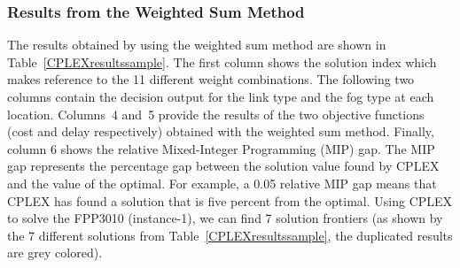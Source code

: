 \documentclass[10pt,journal,compsoc]{IEEEtran}
\begin{document}
\subsubsection{Results from the Weighted Sum Method}
The results obtained by using the weighted sum method are shown in Table~\ref{CPLEXresultssample}. The first column shows the solution index which makes reference to the 11 different weight combinations. The following two columns contain the decision output for the link type and the fog type at each location. Columns~4 and~5 provide the results of the two objective functions (cost and delay respectively) obtained with the weighted sum method. Finally, column 6 shows the relative Mixed-Integer Programming (MIP) gap. The MIP gap represents the percentage gap between the solution value found by CPLEX and the value of the optimal. For example, a 0.05 relative MIP gap means that CPLEX has found a solution that is five percent from the optimal. Using CPLEX to solve the FPP3010 (instance-1), we can find 7 solution frontiers (as shown by the 7 different solutions from Table~\ref{CPLEXresultssample}, the duplicated results are grey colored). 
\end{document}
